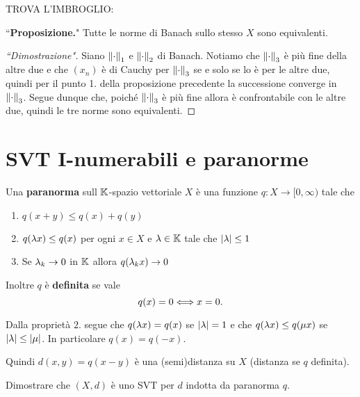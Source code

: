 \begin{exercise}
TROVA L'IMBROGLIO:

\noindent
``\textbf{Proposizione.}" Tutte le norme di Banach sullo stesso $X$ sono equivalenti.
\begin{proof}[``Dimostrazione"]
    Siano $\left\Vert{\cdot}\right\Vert_1$ e $\left\Vert{\cdot}\right\Vert_2$ di Banach. Notiamo che $\left\Vert{\cdot}\right\Vert_3$ \`e pi\`u fine della altre due e che $(x_n)$ \`e di Cauchy per $\left\Vert{\cdot}\right\Vert_3$ se e solo se lo \`e per le altre due, quindi per il punto 1. della proposizione precedente la successione converge in $\left\Vert{\cdot}\right\Vert_3$. Segue dunque che, poich\'e $\left\Vert{\cdot}\right\Vert_3$ \`e pi\`u fine allora \`e confrontabile con le altre due, quindi le tre norme sono equivalenti.
\end{proof}
\end{exercise}


\section{SVT I-numerabili e paranorme}
\begin{definition}[Paranorma]
Una \textbf{paranorma} sull $\mathbb{K}$-spazio vettoriale $X$ \`e una funzione $q:X\to[0,\infty)$ tale che
\begin{enumerate}
    \item $q(x+y)\leq q(x)+q(y)$
    \item $q(\lambda x)\leq q(x)$ per ogni $x\in X$ e $\lambda\in\mathbb{K}$ tale che $\left|{\lambda}\right|\leq 1$
    \item Se $\lambda_k\to 0$ in $\mathbb{K}$ allora $q(\lambda_k x)\to 0$
\end{enumerate}
Inoltre $q$ \`e \textbf{definita} se vale
\[q(x)=0\Longleftrightarrow x=0.\]
\end{definition}

\begin{remark}
Dalla propriet\`a $2.$ segue che $q(\lambda x)=q(x)$ se $\left|{\lambda}\right|=1$ e che $q(\lambda x)\leq q(\mu x)$ se $\left|{\lambda}\right|\leq\left|{\mu}\right|$. In particolare $q(x)=q(-x)$.

Quindi $d(x,y)=q(x-y)$ \`e una (semi)distanza su $X$ (distanza se $q$ definita).
\end{remark}

\begin{exercise}
Dimostrare che $(X,d)$ \`e uno SVT per $d$ indotta da paranorma $q$.
\end{exercise}

